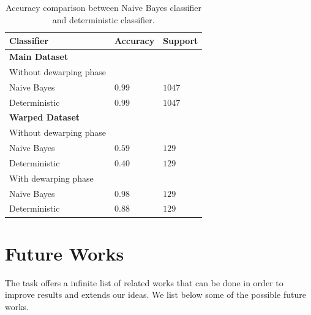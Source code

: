 \documentclass[10pt,twocolumn,letterpaper]{article}
\begin{document}
\begin{table}[!h]
  \begin{center}
    \begin{tabular}{lll}
      \hline
      Classifier              & Accuracy & Support \\ \hline
      \textbf{Main Dataset}                        \\
      \small Without dewarping phase               \\
      \; \; Naive Bayes       & $0.99$   & $1047$  \\
      \; \; Deterministic     & $0.99$   & $1047$  \\ \hline

      \textbf{Warped Dataset} &          &         \\
      \small Without dewarping phase               \\
      \; \; Naive Bayes       & $0.59$   & $129$   \\
      \; \; Deterministic     & $0.40$   & $129$   \\

      \small With dewarping phase                  \\
      \; \; Naive Bayes       & $0.98$   & $129$   \\
      \; \; Deterministic     & $0.88$   & $129$   \\ \hline
    \end{tabular}
  \end{center}
  \label{table:classifiers-comparison}
  \caption{Accuracy comparison between Naive Bayes classifier and
    deterministic classifier.}
\end{table}

\section{Future Works}
\label{sec:future-works}

The task offers a infinite list of related works that can be done in
order to improve results and extends our ideas. We list below some of the
possible future works.
\end{document}
